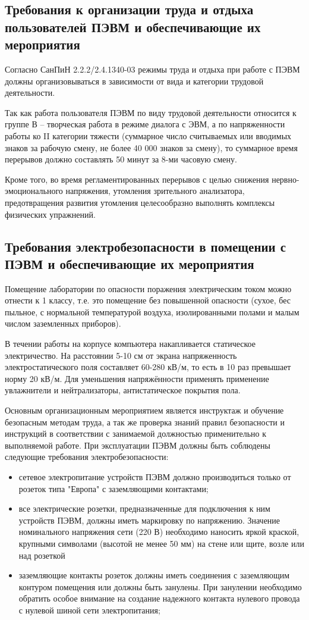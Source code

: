 \subsection{Требования к организации труда и отдыха пользователей ПЭВМ и обеспечивающие их мероприятия}
Согласно СанПиН 2.2.2/2.4.1340-03 режимы труда и отдыха при работе с ПЭВМ должны организовываться в зависимости от вида и категории трудовой деятельности.

Так как работа пользователя ПЭВМ по виду трудовой деятельности относится к группе В – творческая работа в режиме диалога с ЭВМ, а по напряженности работы ко II категории тяжести (суммарное число считываемых или вводимых знаков за рабочую смену, не более 40 000 знаков за смену), то суммарное время перерывов должно составлять 50 минут за 8-ми часовую смену.

Кроме того, во время регламентированных перерывов с целью снижения нервно-эмоционального напряжения, утомления зрительного анализатора, предотвращения развития утомления целесообразно выполнять комплексы физических упражнений.

\subsection{Требования электробезопасности в помещении с ПЭВМ и обеспечивающие их мероприятия}
Помещение лаборатории по опасности поражения электрическим током можно отнести к 1 классу, т.е. это помещение без повышенной опасности (сухое,  бес пыльное,  с нормальной температурой воздуха, изолированными полами и малым числом заземленных приборов).

В течении работы на корпусе компьютера накапливается статическое электричество. На расстоянии 5-10 см от экрана напряженность электростатического поля составляет 60-280 кВ/м, то есть в 10 раз  превышает  норму  20 кВ/м. Для уменьшения напряжённости применять применение увлажнители и нейтрализаторы, антистатическое покрытия пола.

Основным организационным мероприятием является инструктаж и обучение безопасным методам труда, а так же проверка знаний правил безопасности и инструкций в соответствии с занимаемой должностью применительно к выполняемой работе.
При эксплуатации ПЭВМ должны быть соблюдены  следующие требования электробезопасности:
\begin{itemize}
	\item сетевое электропитание  устройств ПЭВМ должно производиться только от розеток типа "Европа" с заземляющими контактами;
	\item все электрические розетки, предназначенные для подключения к ним устройств ПЭВМ, должны иметь маркировку по напряжению. Значение  номинального напряжения сети (220 В) необходимо наносить яркой краской, крупными символами (высотой не менее 50 мм) на стене или щите, возле или над розеткой
	\item заземляющие контакты розеток должны иметь  соединения с заземляющим контуром помещения или должны быть занулены. При занулении необходимо обратить особое внимание на создание надежного контакта нулевого провода с нулевой шиной сети электропитания;
\end{itemize}

